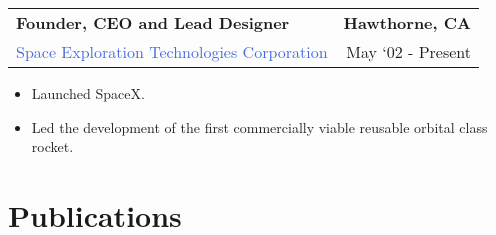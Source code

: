 \documentclass[10pt]{article}
\newcommand{\highlightcolor}{RoyalBlue}
\newcommand{\tabularxwidth}{\textwidth}
\begin{document}
    \begin{minipage}{\tabularxwidth}

        \begin{tabularx}{\tabularxwidth}{X r}
            \textbf{Founder, CEO and Lead Designer} & \textbf{Hawthorne, 
        CA} \\
            \textcolor{\highlightcolor}{Space Exploration Technologies Corporation} & 
        
    May ‘02 - Present \\
            
            
        \end{tabularx}

        \begin{itemize}[noitemsep, topsep=3pt, parsep=0pt, partopsep=0pt]
            
                \item 
    Launched SpaceX.
            
                \item 
    Led the development of the first commercially viable reusable orbital class rocket.
            
        \end{itemize}

        

    \end{minipage}
    


    
        \section{Publications}
\end{document}
